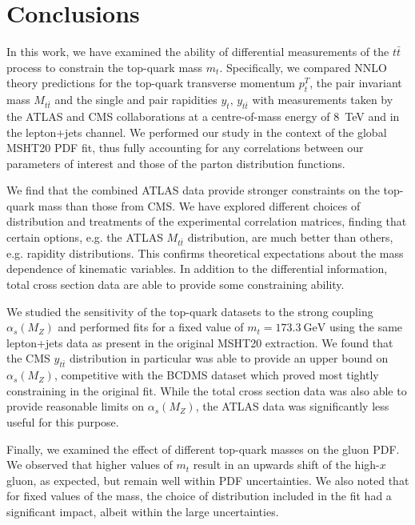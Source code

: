 \documentclass[sn-mathphys]{sn-jnl}%
\newcommand{\pT}{p^T_t}
\newcommand{\mtt}{M_{t\bar{t}}}
\newcommand{\yt}{y_{t}}
\newcommand{\ytt}{y_{t\bar{t}}}
\newcommand{\mt}{m_t}
\newcommand{\ttbar}{t\bar{t}}
\newcommand{\as}{\alpha_s(M_Z)}
\newcommand{\gev}{\mathrm{GeV}}
\begin{document}
\section{Conclusions}\label{conc}
In this work, we have examined the ability of differential measurements of the $\ttbar$ process to constrain the top-quark mass $\mt$. Specifically, we compared NNLO theory predictions for the top-quark transverse momentum $\pT$, the pair invariant mass $\mtt$ and the single and pair rapidities $\yt,\,\ytt$ with measurements taken by the ATLAS and CMS collaborations at a centre-of-mass energy of 8~TeV and in the lepton+jets channel. We performed our study in the context of the global MSHT20 PDF fit, thus fully accounting for any correlations between our parameters of interest and those of the parton distribution functions. 

We find that the combined ATLAS data provide stronger constraints on the top-quark mass than those from CMS. We have explored different choices of distribution and treatments of the experimental correlation matrices, finding that certain options, e.g. the ATLAS $\mtt$ distribution, are much better than others, e.g. rapidity distributions. This confirms theoretical expectations about the mass dependence of kinematic variables. In addition to the differential information, total cross section data are able to provide some constraining ability. 

We studied the sensitivity of the top-quark datasets to the strong coupling $\as$ and performed fits for a fixed value of $\mt=173.3~\gev$ using the same lepton+jets data as present in the original MSHT20 extraction. We found that the CMS $\ytt$ distribution in particular was able to provide an upper bound on $\as$, competitive with the BCDMS dataset which proved most tightly constraining in the original fit. While the total cross section data was also able to provide reasonable limits on $\as$, the ATLAS data was significantly less useful for this purpose.

Finally, we examined the effect of different top-quark masses on the gluon PDF. We observed that higher values of $\mt$ result in an upwards shift of the high-$x$ gluon, as expected, but remain well within PDF uncertainties. We also noted that for fixed values of the mass, the choice of distribution included in the fit had a significant impact, albeit within the large uncertainties.
\end{document}

